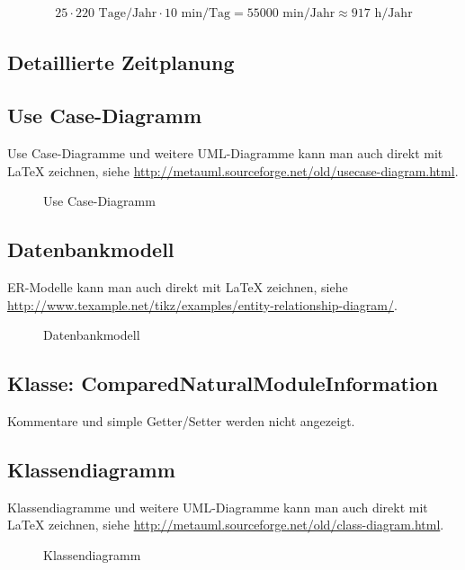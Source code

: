 \begin{eqnarray}
25 \cdot 220 \mbox{ Tage/Jahr} \cdot 10 \mbox{ min/Tag} = 55000 \mbox{ min/Jahr} \approx 917 \mbox{ h/Jahr} 
\end{eqnarray}
\clearpage




\subsection{Detaillierte Zeitplanung}
\label{app:Zeitplanung}



\clearpage

\subsection{Use Case-Diagramm}
\label{app:UseCase}
Use Case-Diagramme und weitere \acs{UML}-Diagramme kann man auch direkt mit \LaTeX{} zeichnen, siehe \zB \url{http://metauml.sourceforge.net/old/usecase-diagram.html}.
\begin{figure}[htb]
\centering
{}
\caption{Use Case-Diagramm}
\end{figure}



\subsection{Datenbankmodell}
\label{app:Datenbankmodell}
ER-Modelle kann man auch direkt mit \LaTeX{} zeichnen, siehe \zB \url{http://www.texample.net/tikz/examples/entity-relationship-diagram/}.
\begin{figure}[htb]
\centering
{}
\caption{Datenbankmodell}
\end{figure}
\clearpage


\clearpage

\clearpage


\subsection{Klasse: ComparedNaturalModuleInformation}
\label{app:CNMI}
Kommentare und simple Getter/Setter werden nicht angezeigt.

\clearpage

\subsection{Klassendiagramm}
\label{app:Klassendiagramm}
Klassendiagramme und weitere \acs{UML}-Diagramme kann man auch direkt mit \LaTeX{} zeichnen, siehe \zB \url{http://metauml.sourceforge.net/old/class-diagram.html}.
\begin{figure}[htb]
\centering
{}
\caption{Klassendiagramm}
\end{figure}
\clearpage


